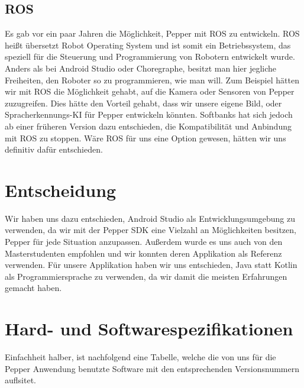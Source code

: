 \subsection{ROS}

Es gab vor ein paar Jahren die Möglichkeit, Pepper mit ROS zu entwickeln. 
ROS heißt übersetzt \glqq Robot Operating System \glqq{} und ist somit ein Betriebssystem, das speziell für die Steuerung und Programmierung 
von Robotern entwickelt wurde. Anders als bei Android Studio oder Choregraphe, besitzt man hier jegliche Freiheiten, den Roboter so zu 
programmieren, wie man will. Zum Beispiel hätten wir mit ROS die Möglichkeit gehabt, auf die Kamera oder Sensoren von Pepper zuzugreifen. 
Dies hätte den Vorteil gehabt, dass wir unsere eigene Bild, oder Spracherkennungs-KI für Pepper entwickeln könnten. Softbanks hat sich 
jedoch ab einer früheren Version dazu entschieden, die Kompatibilität und Anbindung mit ROS zu stoppen. Wäre ROS für uns eine Option 
gewesen, hätten wir uns definitiv dafür entschieden. \\

\section{Entscheidung}

Wir haben uns dazu entschieden, Android Studio als Entwicklungsumgebung zu verwenden, da wir mit der Pepper SDK eine Vielzahl an 
Möglichkeiten besitzen, Pepper für jede Situation anzupassen. Außerdem wurde es uns auch von den Masterstudenten empfohlen und wir konnten 
deren Applikation als Referenz verwenden. Für unsere Applikation haben wir uns entschieden, Java statt Kotlin als Programmiersprache zu 
verwenden, da wir damit die meisten Erfahrungen gemacht haben.\\ 

\section{Hard- und Softwarespezifikationen}
Einfachheit halber, ist nachfolgend eine Tabelle, welche die von uns für die Pepper Anwendung benutzte Software mit den
entsprechenden Versionsnummern auflsitet.

